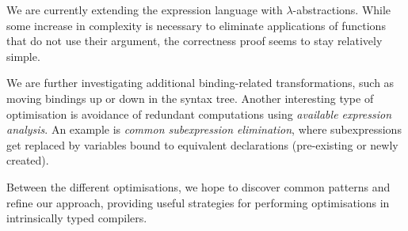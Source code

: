 \documentclass[sigplan,nonacm,screen,review,timestamp]{acmart}
\begin{document}
We are currently extending the expression language
with $\lambda$-abstractions.
While some increase in complexity is necessary to eliminate applications of functions that do not use their argument,
the correctness proof seems to stay relatively simple.

We are further investigating additional binding-related transformations,
such as moving bindings up or down in the syntax tree.
Another interesting type of optimisation is avoidance of redundant computations
using \emph{available expression analysis}.
An example is \emph{common subexpression elimination},
where subexpressions get replaced by variables bound to equivalent declarations
(pre-existing or newly created).

Between the different optimisations,
we hope to discover common patterns and refine our approach,
providing useful strategies for performing optimisations in intrinsically typed compilers.


{}
\end{document}
